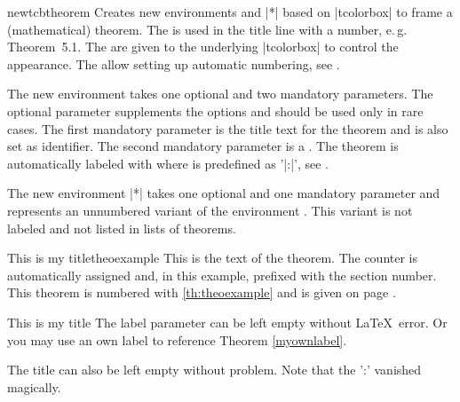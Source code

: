 \begin{docCommand}[doc updated=2016-06-22]{newtcbtheorem}{}
  Creates new environments  and |*| based on |tcolorbox| to frame a
  (mathematical) theorem. The  is used in the title line
  with a number, e.\,g. \mbox{\flqq Theorem 5.1\frqq}.
  The  are given to the underlying |tcolorbox| to control
  the appearance.
  The  allow setting up automatic numbering,
  see .\par
  The new environment  takes one optional and two mandatory
  parameters. The optional parameter supplements the options and should be
  used only in rare cases.
  The first mandatory parameter is the title text for the theorem and
  is also set as  identifier.
  The second mandatory parameter is a . The theorem is
  automatically labeled with 
  where  is predefined as '|:|', see .\par
  The new environment |*| takes one optional and one mandatory
  parameter and represents an unnumbered variant of the environment .
  This variant is not labeled and not listed in lists of theorems.
\begin{dispExample}
\begin{mytheo}{This is my title}{theoexample}
  This is the text of the theorem. The counter is automatically assigned and,
  in this example, prefixed with the section number. This theorem is numbered with
  \ref{th:theoexample} and is given on page \pageref{th:theoexample}.
\end{mytheo}
\end{dispExample}

\begin{dispExample}
\begin{mytheo}[label=myownlabel]{This is my title}{}
  The label parameter can be left empty without \LaTeX\ error.
  Or you may use an own label to reference Theorem \ref{myownlabel}.
\end{mytheo}
\end{dispExample}

\begin{dispExample}
\begin{mytheo}{}{}
  The title can also be left empty without problem. Note that the ':'
  vanished magically.
\end{mytheo}
\end{dispExample}


\end{docCommand}
